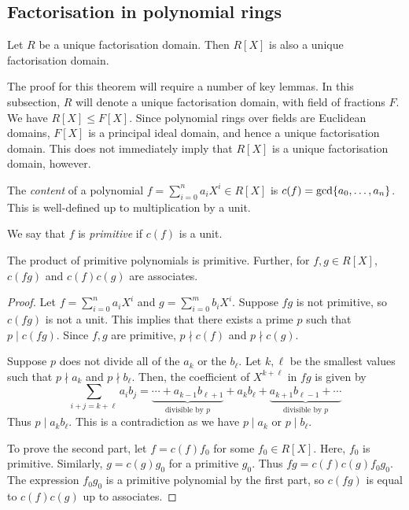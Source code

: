 \subsection{Factorisation in polynomial rings}
\begin{theorem}
	Let \( R \) be a unique factorisation domain.
	Then \( R[X] \) is also a unique factorisation domain.
\end{theorem}
The proof for this theorem will require a number of key lemmas.
In this subsection, \( R \) will denote a unique factorisation domain, with field of fractions \( F \).
We have \( R[X] \leq F[X] \).
Since polynomial rings over fields are Euclidean domains, \( F[X] \) is a principal ideal domain, and hence a unique factorisation domain.
This does not immediately imply that \( R[X] \) is a unique factorisation domain, however.
\begin{definition}
	The \textit{content} of a polynomial \( f = \sum_{i=0}^n a_i X^i \in R[X] \) is \( c(f) = \mathrm{gcd}\qty{a_0, \dots, a_n} \).
	This is well-defined up to multiplication by a unit.

	We say that \( f \) is \textit{primitive} if \( c(f) \) is a unit.
\end{definition}
\begin{lemma}
	The product of primitive polynomials is primitive.
	Further, for \( f, g \in R[X] \), \( c(fg) \) and \( c(f)c(g) \) are associates.
\end{lemma}
\begin{proof}
	Let \( f = \sum_{i=0}^n a_i X^i \) and \( g = \sum_{i=0}^m b_i X^i \).
	Suppose \( fg \) is not primitive, so \( c(fg) \) is not a unit.
	This implies that there exists a prime \( p \) such that \( p \mid c(fg) \).
	Since \( f, g \) are primitive, \( p \nmid c(f) \) and \( p \nmid c(g) \).

	Suppose \( p \) does not divide all of the \( a_k \) or the \( b_\ell \).
	Let \( k, \ell \) be the smallest values such that \( p \nmid a_k \) and \( p \nmid b_\ell \).
	Then, the coefficient of \( X^{k+\ell} \) in \( fg \) is given by
	\[
		\sum_{i+j=k+\ell} a_i b_j = \underbrace{\cdots + a_{k-1} b_{\ell+1}}_{\text{divisible by } p} + a_k b_\ell + \underbrace{a_{k+1} b_{\ell - 1} + \cdots}_{\text{divisible by } p}
	\]
	Thus \( p \mid a_k b_\ell \).
	This is a contradiction as we have \( p \mid a_k \) or \( p \mid b_\ell \).

	To prove the second part, let \( f = c(f) f_0 \) for some \( f_0 \in R[X] \).
	Here, \( f_0 \) is primitive.
	Similarly, \( g = c(g) g_0 \) for a primitive \( g_0 \).
	Thus \( fg = c(f) c(g) f_0 g_0 \).
	The expression \( f_0 g_0 \) is a primitive polynomial by the first part, so \( c(fg) \) is equal to \( c(f) c(g) \) up to associates.
\end{proof}
